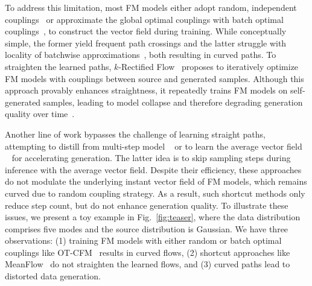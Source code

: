 To address this limitation, most FM models either adopt random, independent couplings~\cite{lipman2022flow} or approximate the global optimal couplings with batch optimal couplings~\cite{fatras2021minibatchoptimaltransportdistances, nguyen2022improvingminibatchoptimaltransport, pooladian2023multisample,kornilov2024optimal, haxholli2024minibatchoptimaltransportperplexity,davtyan2025faster,lin2025beyond, cheng2025curse}, to construct the vector field during training.  While conceptually simple, the former yield frequent path crossings and the latter struggle with locality of batchwise approximations~\cite{fatras2021unbalanced}, both resulting in curved paths.  To straighten the learned paths, $k$-Rectified Flow~\cite{liu2022flow} proposes to iteratively optimize FM models with couplings between source and generated samples.  Although this approach provably enhances straightness, it repeatedly trains FM models on self-generated samples, leading to model collapse and therefore degrading generation quality over time~\cite{zhu2025analyzingmitigatingmodelcollapse}.

Another line of work bypasses the challenge of learning straight paths, attempting to distill from multi-step model ~\cite{salimans2022progressive, geng2023one, sauer2024adversarial, song2023consistency, yin2024one, zhou2024score} or to learn the average vector field ~\cite{kimconsistency, frans2024one,boffi2024flow, geng2025mean} for accelerating generation.  The latter idea is to skip sampling steps during inference with the average vector field.  Despite their efficiency, these approaches do not modulate the underlying instant vector field of FM models, which remains curved due to random coupling strategy.  As a result, such shortcut methods only reduce step count, but do not enhance generation quality. To illustrate these issues, we present a toy example in Fig.~\ref{fig:teaser}, where the data distribution comprises five modes and the source distribution is Gaussian.  We have three observations: (1) training FM models with either random or  batch optimal couplings like OT-CFM~\cite{tong2024improvinggeneralizingflowbasedgenerative} results in curved flows, (2) shortcut approaches like MeanFlow~\cite{geng2025mean} do not straighten the learned flows, and (3) curved paths lead to distorted data generation. 

